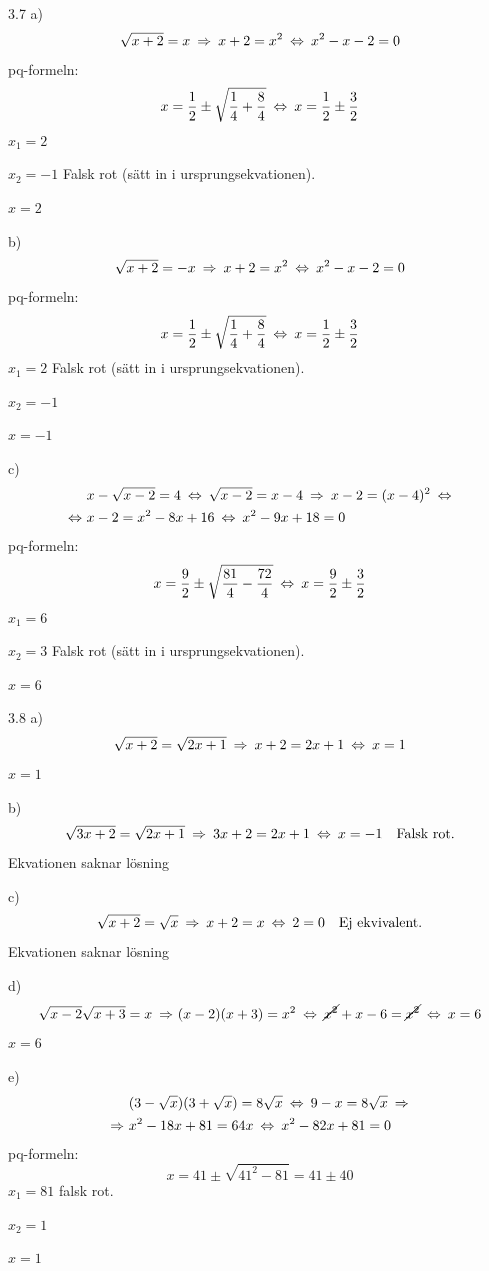 \begin{task}{3.7 a)}
	\[\sqrt{x+2}=x \ra
	x+2=x^2 \lra
	x^2-x-2=0 \]
	pq-formeln:
	\[x=\frac{1}{2}\pm\sqrt{\frac{1}{4}+\frac{8}{4}} \lra
	x=\frac{1}{2}\pm\frac{3}{2}\]
	$x_1=2$
	
	$x_2=-1$ Falsk rot (sätt in i ursprungsekvationen).
	
	\ans $x=2$
\end{task}

\begin{task}{b)}
	\[\sqrt{x+2}=-x \ra
	x+2=x^2 \lra
	x^2-x-2=0\]
	pq-formeln:
	\[x=\frac{1}{2}\pm\sqrt{\frac{1}{4}+\frac{8}{4}} \lra
	x=\frac{1}{2}\pm\frac{3}{2}\]
	$x_1=2$ Falsk rot (sätt in i ursprungsekvationen).
	
	$x_2=-1$
	
	\ans $x=-1$
\end{task}

\begin{task}{c)}
	\begin{align*}
	&x-\sqrt{x-2}=4 \lra
	\sqrt{x-2}=x-4 \ra
	x-2=(x-4)^2 \lra \\ \lra
	&x-2=x^2-8x+16 \lra
	x^2-9x+18=0
	\end{align*}
	pq-formeln: 
	\[x=\frac{9}{2}\pm\sqrt{\frac{81}{4}-\frac{72}{4}} \lra
	x=\frac{9}{2}\pm\frac{3}{2}\]
	$x_1=6$
	
	$x_2=3$ Falsk rot (sätt in i ursprungsekvationen).
	
	\ans $x=6$
\end{task}

\begin{task}{3.8 a)}
	\[\sqrt{x+2}=\sqrt{2x+1} \ra
	x+2=2x+1 \lra
	x=1\]
	\ans $x=1$
\end{task}

\begin{task}{b)}
	\[\sqrt{3x+2}=\sqrt{2x+1} \ra
	3x+2=2x+1 \lra
	x=-1 \text{\quad Falsk rot.}\]
	\ans Ekvationen saknar lösning
\end{task}

\begin{task}{c)}
	\[\sqrt{x+2}=\sqrt{x} \ra
	x+2=x \lra
	2=0 \text{\quad Ej ekvivalent.}\]
	\ans Ekvationen saknar lösning
\end{task}

\begin{task}{d)}
	\[\sqrt{x-2}\sqrt{x+3}=x \ra
	(x-2)(x+3)=x^2 \lra
	\cancel{x^2}+x-6=\cancel{x^2} \lra
	x=6\]
	\ans $x=6$
\end{task}

\begin{task}{e)}
	\begin{align*}
	&(3-\sqrt{x})(3+\sqrt{x})=8\sqrt{x} \lra
	9-x=8\sqrt{x} \ra \\ \ra
	&x^2-18x+81=64x \lra
	x^2-82x+81=0
	\end{align*}
	pq-formeln:
	\[x=41\pm\sqrt{41^2-81}=41\pm40\]
	$x_1=81$ falsk rot.
	
	$x_2=1$
	
	\ans $x=1$
\end{task}

